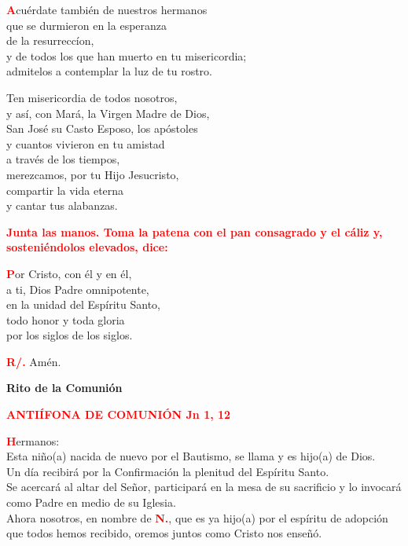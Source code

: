 \documentclass[12pt, letterpaper]{report}
\begin{document}
\lettrine[lines=1]{\bfseries \textcolor{red}{A}}{}\Large cu\'erdate tambi\'en de nuestros hermanos\\
que se durmieron en la esperanza\\
de la resurrecc\'ion,\\
y de todos los que han muerto en tu misericordia;\\
admitelos a contemplar la luz de tu rostro.\newline

Ten misericordia de todos nosotros,\\
y as\'i, con Mar\'a, la Virgen Madre de Dios,\\
San Jos\'e su Casto Esposo, los ap\'ostoles\\
y cuantos vivieron en tu amistad\\
a trav\'es de los tiempos,\\
merezcamos, por tu Hijo Jesucristo,\\
compartir la vida eterna\\
y cantar tus alabanzas. \newline

\newpage


\large{\bfseries \textcolor{red}{Junta las manos. Toma la patena con el pan consagrado y el c\'aliz y, sosteni\'endolos elevados, dice:}}

\lettrine[lines=1]{\bfseries \textcolor{red}{P}}{}\Large or Cristo, con \'el y en \'el,\\
a ti, Dios Padre omnipotente,\\
en la unidad del Esp\'iritu Santo,\\
todo honor y toda gloria\\
por los siglos de los siglos.\newline

\Large \hspace{-0.9cm} {\bfseries \textcolor{red}{R/.}} \hspace{0.5cm} Am\'en.


\begin{center}
\Huge {\bfseries Rito de la Comuni\'on}
\end{center}

\Large {\bfseries \textcolor{red}{ANTI\'IFONA DE COMUNI\'ON \hspace{2cm} Jn 1, 12}}

\lettrine[lines=1]{\bfseries \textcolor{red}{H}}{}\Large ermanos: \\
Esta ni\~no(a) nacida de nuevo por el Bautismo, se llama y es hijo(a) de Dios. \\
Un d\'ia recibir\'a por la Confirmaci\'on la plenitud del Esp\'iritu Santo. \\
Se acercar\'a al altar del Se\~nor, participar\'a en la mesa de su sacrificio y lo invocar\'a como Padre en medio de su Iglesia. \\
Ahora nosotros, en nombre de {\bfseries \textcolor{red}{N.}}, que es ya hijo(a) por el esp\'iritu de adopci\'on que todos hemos recibido, oremos juntos como Cristo nos ense\~n\'o. \newline
\end{document}
